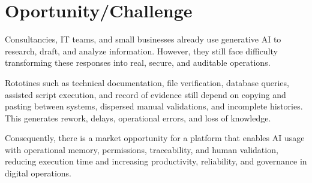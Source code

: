 \section{Oportunity/Challenge}

Consultancies, IT teams, and small businesses already use generative AI to research, draft, and analyze information. However, they still face difficulty transforming these responses into real, secure, and auditable operations.

Rototines such as technical documentation, file verification, database queries, assisted script execution, and record of evidence still depend on copying and pasting between systems, dispersed manual validations, and incomplete histories. This generates rework, delays, operational errors, and loss of knowledge.

Consequently, there is a market opportunity for a platform that enables AI usage with operational memory, permissions, traceability, and human validation, reducing execution time and increasing productivity, reliability, and governance in digital operations.
